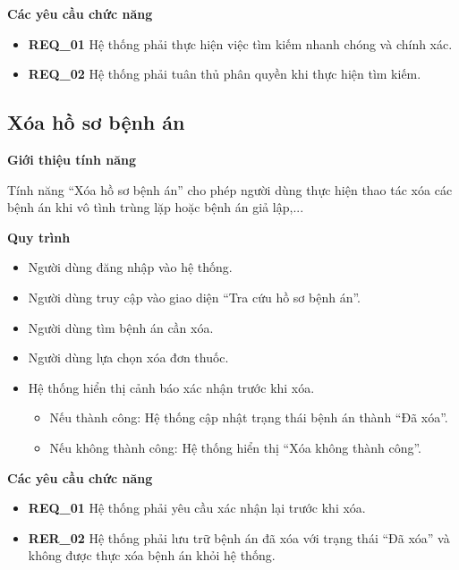 \noindent \textbf{Các yêu cầu chức năng}
\begin{itemize}
  \item \textbf{REQ\_01} Hệ thống phải thực hiện việc tìm kiếm nhanh chóng và chính xác.
  \item \textbf{REQ\_02} Hệ thống phải tuân thủ phân quyền khi thực hiện tìm kiếm.
\end{itemize}

\subsection{Xóa hồ sơ bệnh án}

\noindent \textbf{Giới thiệu tính năng}

Tính năng ``Xóa hồ sơ bệnh án'' cho phép người dùng thực hiện thao tác xóa các bệnh án khi vô tình trùng lặp hoặc bệnh án giả lập,...

\noindent \textbf{Quy trình}
\begin{itemize}
  \item Người dùng đăng nhập vào hệ thống.
  \item Người dùng truy cập vào giao diện ``Tra cứu hồ sơ bệnh án''.
  \item Người dùng tìm bệnh án cần xóa.
  \item Người dùng lựa chọn xóa đơn thuốc.
  \item Hệ thống hiển thị cảnh báo xác nhận trước khi xóa.
    \begin{itemize}
      \item Nếu thành công: Hệ thống cập nhật trạng thái bệnh án thành ``Đã xóa''.
      \item Nếu không thành công: Hệ thống hiển thị ``Xóa không thành công''.
    \end{itemize}
\end{itemize}

\noindent \textbf{Các yêu cầu chức năng}
\begin{itemize}
  \item \textbf{REQ\_01} Hệ thống phải yêu cầu xác nhận lại trước khi xóa.
  \item \textbf{RER\_02} Hệ thống phải lưu trữ bệnh án đã xóa với trạng thái ``Đã xóa'' và không được thực xóa bệnh án khỏi hệ thống.
\end{itemize}